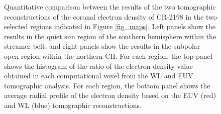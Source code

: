 \documentclass[baaa]{baaa}
\begin{document}
\begin{figure}[!h]
  \caption{Quantitative comparison between the results of the two tomographic reconstructions of the coronal electron density of CR-2198 in the two selected regions indicated in Figure \ref{fig_maps}. Left panels show the results in the quiet sun region of the southern hemisphere within the streamer belt, and right panels show the results in the subpolar open region within the northern CH. For each region, the top panel shows the histogram of the ratio of the electron density value obtained in each computational voxel from the WL and EUV tomographic analysis. For each region, the bottom panel shows the average radial profile of the electron density based on the EUV (red) and WL (blue) tomographic reconstructions.}
  \label{fig_analysis}
\end{figure}


\small

 
\end{document}
